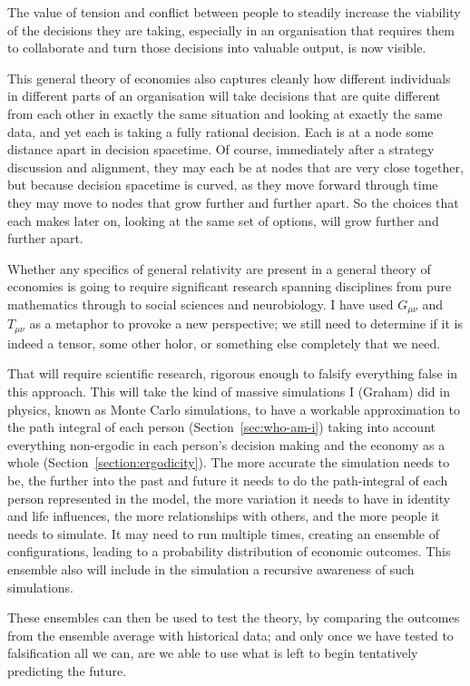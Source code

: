 The value of tension and conflict between people to steadily increase the viability of the decisions they are taking, especially in an organisation that requires them to collaborate and turn those decisions into valuable output,  is now visible.


This general theory of economies also captures cleanly how different individuals in different parts of an organisation will take decisions that are quite different from each other in exactly the same situation and looking at exactly the same data, and yet each is taking a fully rational decision. Each is at a node some distance apart in decision spacetime. Of course, immediately after a strategy discussion and alignment, they may each be at nodes that are very close together, but because decision spacetime is curved, as they move forward through time they may move to nodes that grow further and further apart. So the choices that each makes later on, looking at the same set of options, will grow further and further apart.


Whether any specifics of general relativity are present in a general theory of economies is going to require significant research spanning disciplines from pure mathematics through to social sciences and neurobiology. I have used $G_{\mu\nu}$ and $T_{\mu\nu}$ as a metaphor to provoke a new perspective; we still need to determine if it is indeed a tensor, some other holor, or something else completely that we need. 


That will require scientific research, rigorous enough to falsify everything false in this approach. This will take the kind of massive simulations I (Graham) did in physics, known as Monte Carlo simulations, to have a workable approximation to the path integral of each person (Section~\ref{sec:who-am-i}) taking into account everything non-ergodic in each person’s decision making and the economy as a whole (Section~\ref{section:ergodicity}). The more accurate the simulation needs to be, the further into the past and future it needs to do the path\hyp{}integral of each person represented in the model, the more variation it needs to have in identity and life influences, the more relationships with others, and the more people it needs to simulate. It may need to run multiple times, creating an ensemble of configurations, leading to a probability distribution of economic outcomes. This ensemble also will include in the simulation a recursive awareness of such simulations.


These ensembles can then be used to test the theory, by comparing the outcomes from the ensemble average with historical data; and only once we have tested to falsification all we can, are we able to use what is left to begin tentatively predicting the future.


